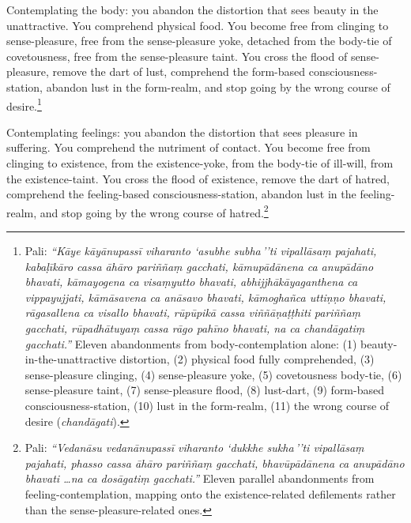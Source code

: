Contemplating the body: you abandon the distortion that sees beauty in the unattractive. You comprehend physical food. You become free from clinging to sense-pleasure, free from the sense-pleasure yoke, detached from the body-tie of covetousness, free from the sense-pleasure taint. You cross the flood of sense-pleasure, remove the dart of lust, comprehend the form-based consciousness-station, abandon lust in the form-realm, and stop going by the wrong course of desire.\footnote{Pali: \textit{``Kāye kāyānupassī viharanto `asubhe subha\,''ti vipallāsaṃ pajahati, kabaḷīkāro cassa āhāro pariññaṃ gacchati, kāmupādānena ca anupādāno bhavati, kāmayogena ca visaṃyutto bhavati, abhijjhākāyaganthena ca vippayujjati, kāmāsavena ca anāsavo bhavati, kāmoghañca uttiṇṇo bhavati, rāgasallena ca visallo bhavati, rūpūpikā cassa viññāṇaṭṭhiti pariññaṃ gacchati, rūpadhātuyaṃ cassa rāgo pahīno bhavati, na ca chandāgatiṃ gacchati.''} Eleven abandonments from body-contemplation alone: (1) beauty-in-the-unattractive distortion, (2) physical food fully comprehended, (3) sense-pleasure clinging, (4) sense-pleasure yoke, (5) covetousness body-tie, (6) sense-pleasure taint, (7) sense-pleasure flood, (8) lust-dart, (9) form-based consciousness-station, (10) lust in the form-realm, (11) the wrong course of desire (\textit{chandāgati}).}

Contemplating feelings: you abandon the distortion that sees pleasure in suffering. You comprehend the nutriment of contact. You become free from clinging to existence, from the existence-yoke, from the body-tie of ill-will, from the existence-taint. You cross the flood of existence, remove the dart of hatred, comprehend the feeling-based consciousness-station, abandon lust in the feeling-realm, and stop going by the wrong course of hatred.\footnote{Pali: \textit{``Vedanāsu vedanānupassī viharanto `dukkhe sukha\,''ti vipallāsaṃ pajahati, phasso cassa āhāro pariññaṃ gacchati, bhavūpādānena ca anupādāno bhavati \ldots na ca dosāgatiṃ gacchati.''} Eleven parallel abandonments from feeling-contemplation, mapping onto the existence-related defilements rather than the sense-pleasure-related ones.}

